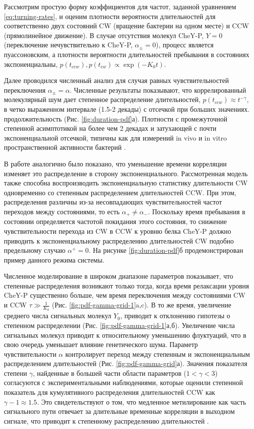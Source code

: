 Рассмотрим простую форму коэффициентов для частот, заданной уравнением \cref{eq:turning-rates}, и оценим плотности вероятности длительностей для соответственно двух состояний CW (вращение бактерии на одном месте) и CCW (прямолинейное движение). В случае отсутствия молекул CheY-P, $Y=0$ (переключение нечувствительно к CheY-P, $\alpha_{\pm}=0$), процесс является пуассоновским, а плотности вероятности длительностей пребывания в состояниях экспоненциальны, $p(t_{ccw}), p(t_{cw}) \propto \exp(-K_0 t)$.

Далее проводился численный анализ для случая равных чувствительностей переключения $\alpha_\pm = \alpha$. Численные результаты показывают, что коррелированный молекулярный шум дает степенное распределение длительностей, $p(t_{ccw}) \approx t^{-\gamma}$, в четко выраженном интервале (1.5-2 декады) с отсечкой при больших значениях. продолжительность (Рис. \cref{fig:duration-pdf}а).
Плотности с промежуточной степенной асимптотикой на более чем 2 декадах и затухающей с почти экспоненциальной отсечкой, типичны как для измерений in vivo и in vitro пространственной активности бактерий \cite{korobkova_molecular_2004,harris_generalized_2012}.

В работе \cite{tu_how_2005} аналогично было показано, что уменьшение времени корреляции изменяет это распределение в сторону экспоненциального. Рассмотренная модель также способна воспроизводить экспоненциальную статистику длительности CW одновременно со степенным распределением длительностей CCW. При этом, распределения различны из-за несовпадающих чувствительностей частот переходов между состояниями, то есть $\alpha_+ \neq \alpha_-$. Поскольку время пребывания в состоянии определяется частотой покидания этого состояния, то снижение чувствительности перехода из CW в CCW к уровню белка CheY-P должно приводить к экспоненциальному распределению длительностей CW подобно предельному случаю $\alpha^+ = 0$. На рисунке \cref{fig:duration-pdf}б продемонстрирован пример данного режима системы.

Численное моделирование в широком диапазоне параметров показывает, что степенные распределения возникают только тогда, когда время релаксации уровня CheY-P существенно больше, чем время переключения между состояниями CW и CCW $\tau \gg \frac{1}{K_0}$ (Рис. \cref{fig:pdf-gamma-grid-1}a,c). В то же время, увеличение среднего числа сигнальных молекул $Y_0$, приводит к отклонению гипотезы о степенном распределении (Рис. \cref{fig:pdf-gamma-grid-1}а,б). Увеличение числа сигнальных молекул приводит к относительному уменьшению флуктуаций, что в свою очередь уменьшает влияние генетического шума. Параметр чувствительности $\alpha$ контролирует переход между степенным и экспоненциальным распределением длительностей (Рис. \cref{fig:pdf-gamma-grid}а). Значения показателя степени $\gamma$, найденные в большей части области параметров ($1 < \gamma < 3$) согласуются с экспериментальными наблюдениями, которые оценили степенной показатель для кумулятивного распределения длительностей CCW как $\gamma - 1 \approx 1.5$. Это свидетельствуют о том, что медленное метилирование как часть сигнального пути отвечает за длительные временные корреляции в выходном сигнале, что приводит к степенному распределению длительностей \cite{korobkova_molecular_2004}. 

